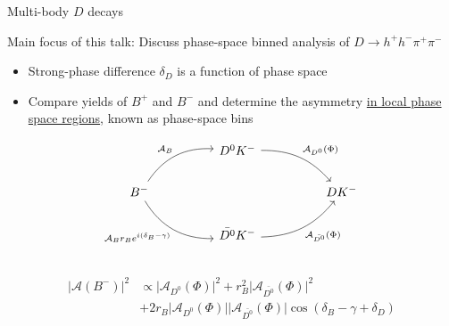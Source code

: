 \documentclass[xcolor={dvipsnames}]{beamer}
\begin{document}
\begin{frame}[fragile]{Multi-body $D$ decays}
  \begin{center}
    Main focus of this talk: Discuss phase-space binned analysis of $D\to h^+h^-\pi^+\pi^-$
  \end{center}
  \vspace{-0.3cm}
  \begin{itemize}
    \setlength\itemsep{0.5em}
    \item{Strong-phase difference $\delta_D$ is a function of phase space}
    \item{Compare yields of $B^+$ and $B^-$ and determine the asymmetry \underline{in local phase space regions}, known as phase-space bins}
  \end{itemize}
  \begin{equation*}
    \begin{tikzcd}[column sep=huge]
      & D^0K^- \arrow[dr, bend left = 25, "\mathcal{A}_{D^0}(\Phi)"] & \\
      B^- \arrow[ur, bend left, "\mathcal{A}_B"] \arrow[dr, bend right, "\mathcal{A}_B r_B e^{i(\delta_B - \gamma)}"'] & [5cm] & DK^- \\
      & \bar{D^0}K^- \arrow[ur, bend right = 25, "\mathcal{A}_{\bar{D^0}}(\Phi)"'] & \\
    \end{tikzcd}
  \end{equation*}
  \vspace{-0.9cm}
  \begin{align*}
    \lvert\mathcal{A}(B^-)\lvert^2&\propto\lvert\mathcal{A}_{D^0}(\Phi)\lvert^2 + r_B^2\lvert\mathcal{A}_{\bar{D^0}}(\Phi)\lvert^2 \\
    &+ 2r_B\lvert\mathcal{A}_{D^0}(\Phi)\lvert\lvert\mathcal{A}_{\bar{D^0}}(\Phi)\lvert\cos(\delta_B - \gamma + \delta_D)
  \end{align*}
\end{frame}
\end{document}
